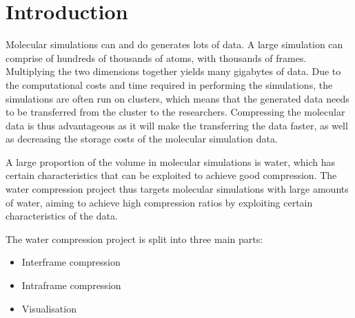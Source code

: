 \chapter{Introduction}
\label{cha:introduction}




Molecular simulations can and do generates lots of data. A large simulation can
comprise of hundreds of thousands of atoms, with thousands of frames.
Multiplying the two dimensions together yields many gigabytes of data. Due to
the computational costs and time required in performing the simulations, the
simulations are often run on clusters, which means that the generated data needs
to be transferred from the cluster to the researchers. Compressing the molecular
data is thus advantageous as it will make the transferring the data faster, as
well as decreasing the storage costs of the molecular simulation data.

A large proportion of the volume in molecular simulations is water, which has
certain characteristics that can be exploited to achieve good compression. The
water compression project thus targets molecular simulations with large amounts
of water, aiming to achieve high compression ratios by exploiting certain
characteristics of the data.

The water compression project is split into three main parts:

\begin{itemize}
  \item Interframe compression
  \item Intraframe compression
  \item Visualisation
\end{itemize}

